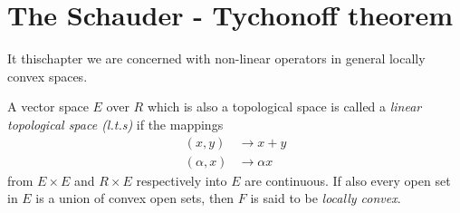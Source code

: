 \chapter{The Schauder - Tychonoff theorem}\label{chap3}

It this\pageoriginale chapter we are concerned with non-linear
operators in general locally convex spaces. 
 
\begin{Definition}%
  A vector space $E$ over $R$ which is also a topological space is
  called a {\em linear topological space  (l.t.s)} if the mappings 
  \begin{align*}
    (x, y)  & \to x + y\\
    (\alpha, x) & \to \alpha x
  \end{align*}
  from $E \times E$ and $R \times E$ respectively into $E$ are
  continuous. If also every open set in $E$ is a union of convex open
  sets, then $F$ is said to be {\em locally convex}. 
\end{Definition} 
 
